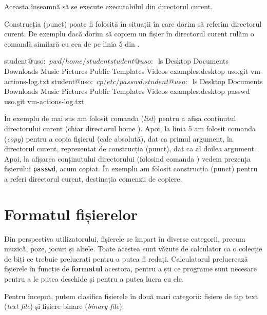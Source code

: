 
Aceasta înseamnă să se execute executabilul  din directorul curent.

Construcția  (punct) poate fi folosită în situații în care dorim să referim directorul curent. De exemplu dacă dorim să copiem un fișier în directorul curent rulăm o comandă similară cu cea de pe linia 5 din .

\begin{screen}[caption={Referința . către directorul curent},label={lst:fs:dot}]
student@uso:~$ pwd
/home/student
student@uso:~$ ls
Desktop  Documents  Downloads  Music  Pictures  Public  Templates  Videos  examples.desktop  uso.git  vm-actions-log.txt
student@uso:~$ cp /etc/passwd .
student@uso:~$ ls
Desktop  Documents  Downloads  Music  Pictures  Public  Templates  Videos  examples.desktop  passwd  uso.git  vm-actions-log.txt
\end{screen}

În exemplu de mai sus am folosit comanda  (\textit{list}) pentru a afișa conținutul directorului curent (chiar directorul home ). Apoi, la linia 5 am folosit comanda  (\textit{copy}) pentru a copia fișierul  (cale absolută), dat ca primul argument, în directorul curent, reprezentat de construcția  (punct), dat ca al doilea argument. Apoi, la afișarea conținutului directorului (folosind comanda ) vedem prezența fișierului \texttt{passwd}, acum copiat. În exemplu am folosit construcția  (punct) pentru a referi directorul curent, destinația comenzii de copiere.

\section{Formatul fișierelor}
\label{sec:fs:file-format}

Din perspectiva utilizatorului, fișierele se împart în diverse categorii, precum muzică, poze, jocuri și altele. Toate acestea sunt văzute de calculator ca o colecție de biți ce trebuie prelucrați pentru a putea fi redați. Calculatorul prelucrează fișierele în funcție de \textbf{formatul} acestora, pentru a ști ce programe sunt necesare pentru a le putea deschide și pentru a putea lucra cu ele.

Pentru început, putem clasifica fișierele în două mari categorii: fișiere de tip text (\textit{text file}) și fișiere binare (\textit{binary file}).

